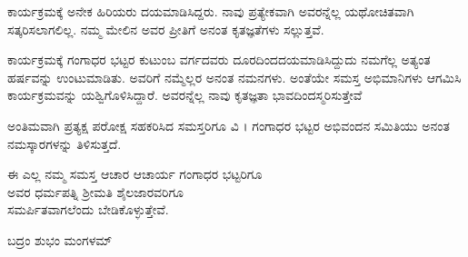 {ಕಾರ್ಯಕ್ರಮಕ್ಕೆ ಅನೇಕ ಹಿರಿಯರು ದಯಮಾಡಿಸಿದ್ದರು. ನಾವು ಪ್ರತ್ಯೇಕವಾಗಿ ಅವರನ್ನೆಲ್ಲ ಯಥೋಚಿತವಾಗಿ ಸತ್ಕರಿಸಲಾಗಲಿಲ್ಲ. ನಮ್ಮ ಮೇಲಿನ ಅವರ ಪ್ರೀತಿಗೆ ಅನಂತ ಕೃತಜ್ಞತೆಗಳು ಸಲ್ಲುತ್ತವೆ. 

ಕಾರ್ಯಕ್ರಮಕ್ಕೆ ಗಂಗಾಧರ ಭಟ್ಟರ ಕುಟುಂಬ ವರ್ಗದವರು ದೂರದಿಂದ\break ದಯಮಾಡಿಸಿದ್ದುದು ನಮಗೆಲ್ಲ ಅತ್ಯಂತ ಹರ್ಷವನ್ನು ಉಂಟುಮಾಡಿತು. ಅವರಿಗೆ ನಮ್ಮೆಲ್ಲರ ಅನಂತ ನಮನಗಳು. ಅಂತೆಯೇ ಸಮಸ್ತ ಅಭಿಮಾನಿಗಳು ಆಗಮಿಸಿ ಕಾರ್ಯಕ್ರಮವನ್ನು ಯಶ್ವಿಗೊಳಿಸಿದ್ದಾರೆ. ಅವರನ್ನೆಲ್ಲ ನಾವು ಕೃತಜ್ಞತಾ ಭಾವದಿಂದ\break ಸ್ಮರಿಸುತ್ತೇವೆ 

ಅಂತಿಮವಾಗಿ ಪ್ರತ್ಯಕ್ಷ ಪರೋಕ್ಷ ಸಹಕರಿಸಿದ ಸಮಸ್ತರಿಗೂ ವಿ । ಗಂಗಾಧರ ಭಟ್ಟರ ಅಭಿವಂದನ ಸಮಿತಿಯು ಅನಂತ ನಮಸ್ಕಾರಗಳನ್ನು ತಿಳಿಸುತ್ತದೆ.

\begin{center}
ಈ ಎಲ್ಲ ನಮ್ಮ ಸಮಸ್ತ ಆಚಾರ  ಆಚಾರ್ಯ ಗಂಗಾಧರ ಭಟ್ಟರಿಗೂ\\ ಅವರ ಧರ್ಮಪತ್ನಿ ಶ್ರೀಮತಿ ಶೈಲಜಾರವರಿಗೂ\\ ಸಮರ್ಪಿತವಾಗಲೆಂದು ಬೇಡಿಕೊಳ್ಳುತ್ತೇವೆ.
\medskip

ಬದ್ರಂ ಶುಭಂ ಮಂಗಳಮ್
\end{center}

\articleend
}
